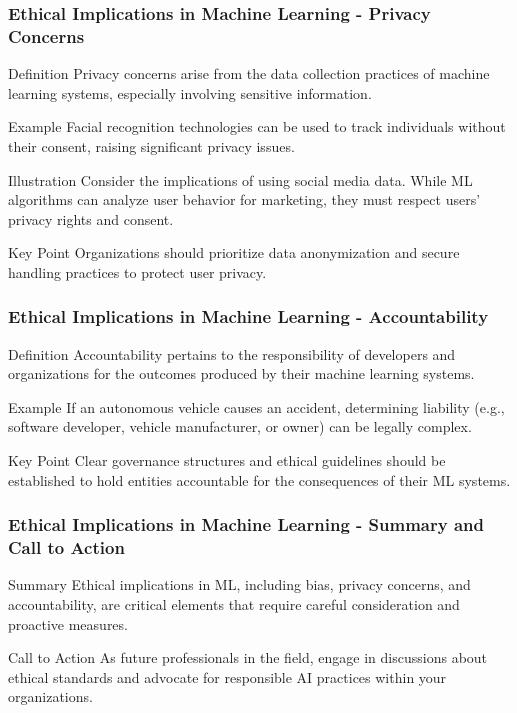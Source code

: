 \documentclass[aspectratio=169]{beamer}
\begin{document}
\begin{frame}[fragile]
    \frametitle{Ethical Implications in Machine Learning - Privacy Concerns}
    \begin{block}{Definition}
        Privacy concerns arise from the data collection practices of machine learning systems, especially involving sensitive information.
    \end{block}
    \begin{block}{Example}
        Facial recognition technologies can be used to track individuals without their consent, raising significant privacy issues.
    \end{block}
    \begin{block}{Illustration}
        Consider the implications of using social media data. While ML algorithms can analyze user behavior for marketing, they must respect users’ privacy rights and consent.
    \end{block}
    \begin{block}{Key Point}
        Organizations should prioritize data anonymization and secure handling practices to protect user privacy.
    \end{block}
\end{frame}

\begin{frame}[fragile]
    \frametitle{Ethical Implications in Machine Learning - Accountability}
    \begin{block}{Definition}
        Accountability pertains to the responsibility of developers and organizations for the outcomes produced by their machine learning systems.
    \end{block}
    \begin{block}{Example}
        If an autonomous vehicle causes an accident, determining liability (e.g., software developer, vehicle manufacturer, or owner) can be legally complex.
    \end{block}
    \begin{block}{Key Point}
        Clear governance structures and ethical guidelines should be established to hold entities accountable for the consequences of their ML systems.
    \end{block}
\end{frame}

\begin{frame}[fragile]
    \frametitle{Ethical Implications in Machine Learning - Summary and Call to Action}
    \begin{block}{Summary}
        Ethical implications in ML, including bias, privacy concerns, and accountability, are critical elements that require careful consideration and proactive measures.
    \end{block}
    \begin{block}{Call to Action}
        As future professionals in the field, engage in discussions about ethical standards and advocate for responsible AI practices within your organizations.
    \end{block}
\end{frame}
\end{document}
